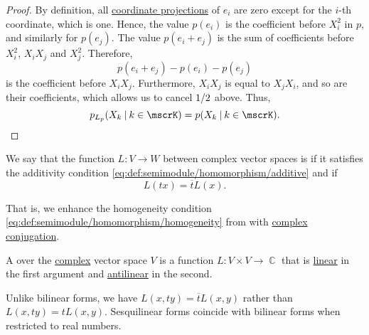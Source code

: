 \begin{proof}
  By definition, all \hyperref[def:basis_decomposition]{coordinate projections} of \( e_i \) are zero except for the \( i \)-th coordinate, which is one. Hence, the value \( p(e_i) \) is the coefficient before \( X_i^2 \) in \( p \), and similarly for \( p(e_j) \). The value \( p(e_i + e_j) \) is the sum of coefficients before \( X_i^2 \), \( X_i X_j \) and \( X_j^2 \). Therefore,
  \begin{equation*}
    p(e_i + e_j) - p(e_i) - p(e_j)
  \end{equation*}
  is the coefficient before \( X_i X_j \). Furthermore, \( X_i X_j \) is equal to \( X_j X_i \), and so are their coefficients, which allows us to cancel \( 1 / 2 \) above. Thus,
  \begin{equation*}
    p_{L_p}(X_k \given k \in \mscrK) = p(X_k \given k \in \mscrK).
  \end{equation*}
\end{proof}

\begin{definition}\label{def:antilinear_function}\mimprovised
  We say that the function \( L: V \to W \) between complex vector spaces is  if it satisfies the additivity condition \eqref{eq:def:semimodule/homomorphism/additive} and if
  \begin{equation}\label{eq:def:antilinear_function}
    L(tx) = \overline t L(x).
  \end{equation}

  That is, we enhance the homogeneity condition \eqref{eq:def:semimodule/homomorphism/homogeneity} from  with \hyperref[def:set_of_complex_numbers]{complex conjugation}.
\end{definition}

\begin{definition}\label{def:sesquilinear_form}
  A  over the \hyperref[def:set_of_complex_numbers]{complex} vector space \( V \) is a function \( L: V \times V \to \BbbC \) that is \hyperref[def:semimodule/homomorphism]{linear} in the first argument and \hyperref[def:antilinear_function]{antilinear} in the second.

  Unlike bilinear forms, we have \( L(x, ty) = \overline t L(x, y) \) rather than \( L(x, ty) = t L(x, y) \). Sesquilinear forms coincide with bilinear forms when restricted to real numbers.
\end{definition}

